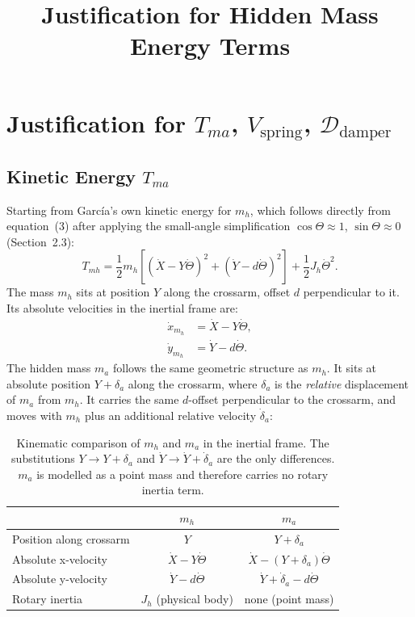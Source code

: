 \documentclass{article}
\title{Justification for Hidden Mass Energy Terms}
\date{}
\begin{document}
\maketitle

\section*{Justification for $T_{ma}$, $V_\text{spring}$, $\mathcal{D}_\text{damper}$}

\subsection*{Kinetic Energy $T_{ma}$}

Starting from Garc\'ia's own kinetic energy for $m_h$, which follows directly
from equation~(3) after applying the small-angle simplification
$\cos\Theta \approx 1$, $\sin\Theta \approx 0$ (Section~2.3):
%
\begin{equation}
    T_{mh} = \frac{1}{2}m_h\left[
        \left(\dot{X} - Y\dot{\Theta}\right)^2
        + \left(\dot{Y} - d\dot{\Theta}\right)^2
    \right] + \frac{1}{2}J_h\dot{\Theta}^2.
\end{equation}
%
The mass $m_h$ sits at position $Y$ along the crossarm, offset $d$
perpendicular to it. Its absolute velocities in the inertial frame are:
%
\begin{align}
    \dot{x}_{m_h} &= \dot{X} - Y\dot{\Theta}, \\
    \dot{y}_{m_h} &= \dot{Y} - d\dot{\Theta}.
\end{align}
%
The hidden mass $m_a$ follows the same geometric structure as $m_h$. It sits
at absolute position $Y + \delta_a$ along the crossarm, where $\delta_a$ is
the \emph{relative} displacement of $m_a$ from $m_h$. It carries the same
$d$-offset perpendicular to the crossarm, and moves with $m_h$ plus an
additional relative velocity $\dot{\delta}_a$:
%
\begin{table}[h]
    \centering
    \begin{tabular}{lcc}
        \toprule
         & $m_h$ & $m_a$ \\
        \midrule
        Position along crossarm  & $Y$                             & $Y + \delta_a$                         \\
        Absolute x-velocity      & $\dot{X} - Y\dot\Theta$         & $\dot{X} - (Y+\delta_a)\dot\Theta$     \\
        Absolute y-velocity      & $\dot{Y} - d\dot\Theta$         & $\dot{Y} + \dot\delta_a - d\dot\Theta$ \\
        Rotary inertia           & $J_h$ (physical body)           & none (point mass)                      \\
        \bottomrule
    \end{tabular}
    \caption{Kinematic comparison of $m_h$ and $m_a$ in the inertial frame.
             The substitutions $Y \to Y + \delta_a$ and
             $\dot{Y} \to \dot{Y} + \dot\delta_a$ are the only differences.
             $m_a$ is modelled as a point mass and therefore carries no
             rotary inertia term.}
\end{table}
\end{document}
